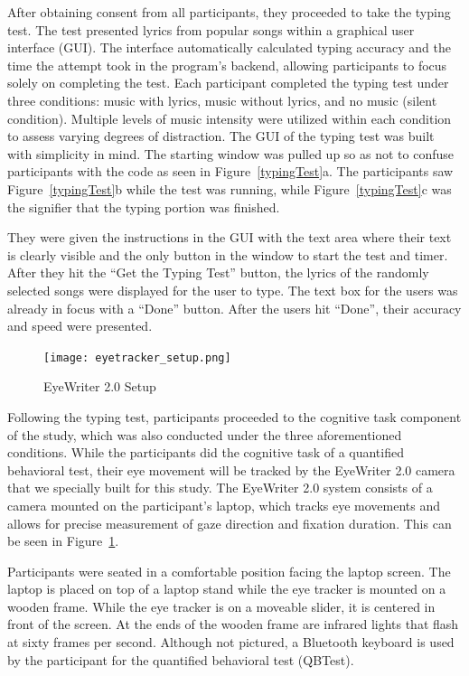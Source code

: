 \documentclass[manuscript, screen, review]{acmart} %
\begin{document}
After obtaining consent from all participants, they proceeded to take the typing test. The test presented lyrics from popular songs within a graphical user interface (GUI). 
The interface automatically calculated typing accuracy and the time the attempt took in the program's backend, allowing participants to focus solely on completing the test.
Each participant completed the typing test under three conditions: music with lyrics, music without lyrics, and no music (silent condition).
Multiple levels of music intensity were utilized within each condition to assess varying degrees of distraction.
The GUI of the typing test was built with simplicity in mind. The starting window was pulled up so as not to confuse participants with the code as seen in Figure~\ref{typingTest}a. The participants saw Figure~\ref{typingTest}b while the test was running, while Figure~\ref{typingTest}c was the signifier that the typing portion was finished. 

They were given the instructions in the GUI with the text area where their text is clearly visible and the only button in the window to start the test and timer. 
After they hit the ``Get the Typing Test'' button, the lyrics of the randomly selected songs were displayed for the user to type. 
The text box for the users was already in focus with a ``Done'' button. After the users hit ``Done'', their accuracy and speed were presented.

\begin{figure}
  \center
  \texttt{[image: eyetracker\_setup.png]}
  \caption{EyeWriter 2.0 Setup}
  \label{EyeWriter}
\end{figure}

Following the typing test, participants proceeded to the cognitive task component of the study, which was also conducted under the three aforementioned conditions. 
While the participants did the cognitive task of a quantified behavioral test, their eye movement will be tracked by the EyeWriter 2.0 camera that we specially built for this study. 
The EyeWriter 2.0 system consists of a camera mounted on the participant's laptop, which tracks eye movements and allows for precise measurement of gaze direction and fixation duration. This can be seen in Figure~\ref{EyeWriter}.

Participants were seated in a comfortable position facing the laptop screen.
The laptop is placed on top of a laptop stand while the eye tracker is mounted on a wooden frame. 
While the eye tracker is on a moveable slider, it is centered in front of the screen. 
At the ends of the wooden frame are infrared lights that flash at sixty frames per second. %
Although not pictured, a Bluetooth keyboard is used by the participant for the quantified behavioral test (QBTest).
\end{document}
